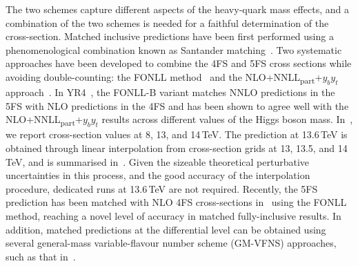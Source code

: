 The two schemes capture different aspects of the heavy-quark mass effects, and a combination of the two schemes is needed for a faithful determination of the cross-section. Matched inclusive predictions have been first performed using a phenomenological combination known as Santander matching~\cite{Harlander:2011aa}. Two systematic approaches have been developed to combine the 4FS and 5FS cross sections while avoiding double-counting: the FONLL method~\cite{Forte:2015hba,Forte:2016sja} and the NLO+NNLL\textsubscript{part}+$y_b y_t$ approach~\cite{Bonvini:2015pxa,Bonvini:2016fgf}. In YR4~\cite{LHCHiggsCrossSectionWorkingGroup:2016ypw}, the FONLL-B variant matches NNLO predictions in the 5FS with NLO predictions in the 4FS and has been shown to agree well with the NLO+NNLL\textsubscript{part}+$y_b y_t$ results across different values of the Higgs boson mass. In~\tab{}, we report cross-section values at 8, 13, and 14\,TeV. The prediction at 13.6\,TeV is obtained through linear interpolation from cross-section grids at 13, 13.5, and 14\,TeV, and is summarised in~\tab{}. Given the sizeable theoretical perturbative uncertainties in this process, and the good accuracy of the interpolation procedure, dedicated runs at 13.6\,TeV are not required. Recently, the \nnnlo{} 5FS prediction has been matched with NLO 4FS cross-sections in~ using the FONLL method, reaching a novel level of accuracy in matched fully-inclusive results. In addition, matched predictions at the differential level can be obtained using several general-mass variable-flavour number scheme (GM-VFNS) approaches, such as that in~.

